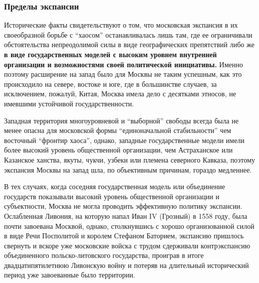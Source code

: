  
 
 
 
 

\subsubsection{Пределы экспансии}
\label{sec:16_01_2022.stz.news.ua.hvylya.1.anatomia_vraga.8.predely_ekspansii}

Исторические факты свидетельствуют о том, что московская экспансия в их
своеобразной борьбе с \enquote{хаосом} останавливалась лишь там, где ее ограничивали
обстоятельства непреодолимой силы в виде географических препятствий либо же \textbf{в
виде государственных моделей с высоким уровнем внутренней организации и
возможностями своей политической инициативы.} Именно поэтому расширение на запад
было для Москвы не таким успешным, как это происходило на севере, востоке и
юге, где в большинстве случаев, за исключением, пожалуй, Китая, Москва имела
дело с десятками этносов, не имевшими устойчивой государственности.

Западная территория многоуровневой и \enquote{выборной} свободы всегда была не менее
опасна для московской формы \enquote{единоначальной стабильности} чем восточный
\enquote{фронтир хаоса}, однако, западные государственные модели имели более высокий
уровень общественной организации, чем Астраханское или Казанское ханства,
якуты, чукчи, узбеки или племена северного Кавказа, поэтому экспансия Москвы на
запад шла, по объективным причинам, гораздо медленнее.

В тех случаях, когда соседняя государственная модель или объединение государств
показывали высокий уровень общественной организации и субъектности, Москва не
могла проводить эффективную политику экспансии. Ослабленная Ливония, на которую
напал Иван IV (Грозный) в 1558 году, была почти завоевана Москвой, однако,
столкнувшись с хорошо организованной силой в виде Речи Посполитой и королем
Стефаном Баторием, экспансию пришлось свернуть и вскоре уже московские войска с
трудом сдерживали контрэкспансию объединенного польско-литовского государства,
проиграв в итоге двадцатипятилетнюю Ливонскую войну и потеряв на длительный
исторический период уже завоеванные было территории.

